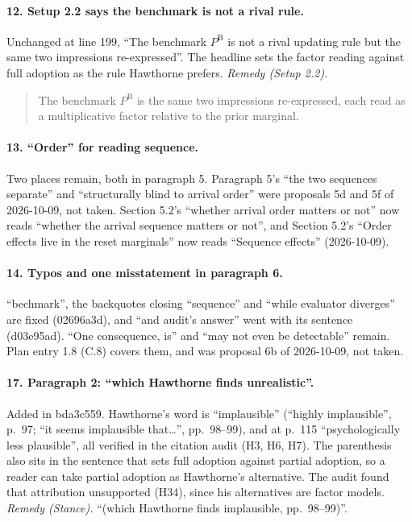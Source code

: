 \documentclass[11pt,a4paper]{article}
\newcommand{\PB}{P^{\mathrm{B}}}
\begin{document}
\paragraph{12. Setup 2.2 says the benchmark is not a rival rule.} Unchanged at line 199, ``The
benchmark $\PB$ is not a rival updating rule but the same two impressions re-expressed''. The
headline sets the factor reading against full adoption as the rule Hawthorne prefers.
\emph{Remedy (Setup 2.2).}
\begin{quote}
The benchmark $\PB$ is the same two impressions re-expressed, each read as a multiplicative factor
relative to the prior marginal.
\end{quote}

\paragraph{13. ``Order'' for reading sequence.} Two places remain, both in paragraph 5. Paragraph 5's ``the two
sequences separate'' and ``structurally blind to arrival order'' were proposals 5d and 5f of
2026-10-09, not taken. Section 5.2's ``whether arrival order matters or not'' now reads
``whether the arrival sequence matters or not'', and Section 5.2's ``Order effects live in the
reset marginals'' now reads ``Sequence effects'' (2026-10-09).

\paragraph{14. Typos and one misstatement in paragraph 6.} ``bechmark'', the backquotes closing
``sequence'' and ``while evaluator diverges'' are fixed (02696a3d), and ``and audit's answer'' went
with its sentence (d03e95ad). ``One consequence, is'' and ``may not even be detectable'' remain.
Plan entry 1.8 (C.8) covers them, and was proposal 6b of 2026-10-09, not taken.

\paragraph{17. Paragraph 2: ``which Hawthorne finds unrealistic''.} Added in bda3c559.
Hawthorne's word is ``implausible'' (``highly implausible'', p.~97; ``it seems implausible
that\ldots'', pp.~98--99), and at p.~115 ``psychologically less plausible'', all verified in the
citation audit (H3, H6, H7). The parenthesis also sits in the sentence that sets full adoption
against partial adoption, so a reader can take partial adoption as Hawthorne's alternative. The
audit found that attribution unsupported (H34), since his alternatives are factor models.
\emph{Remedy (Stance).} ``(which Hawthorne finds implausible, pp.~98--99)''.
\end{document}
